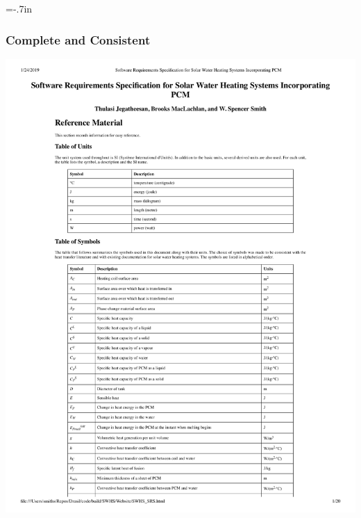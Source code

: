 \documentclass{beamer}
\begin{document}
\hoffset=-.7in 
\begin{frame}
\frametitle{Complete and Consistent}
\includegraphics[width=1.2\textwidth]{TableOfSymbols.pdf}
\end{frame}
\hoffset=0in

\end{document}
